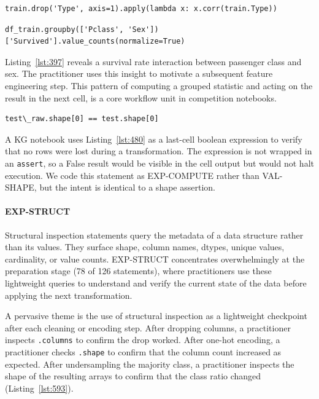 \begin{lstlisting}[caption={}, label={lst:564}]
train.drop('Type', axis=1).apply(lambda x: x.corr(train.Type))
\end{lstlisting}

\begin{lstlisting}[caption={}, label={lst:397}]
df_train.groupby(['Pclass', 'Sex'])['Survived'].value_counts(normalize=True)
\end{lstlisting}

Listing~\ref{lst:397} reveals a survival rate interaction between passenger class and sex.
The practitioner uses this insight
to motivate a subsequent feature engineering step.
This pattern of computing a grouped statistic
and acting on the result in the next cell,
is a core workflow unit in competition notebooks.

\begin{lstlisting}[caption={}, label={lst:480}]
test\_raw.shape[0] == test.shape[0]
\end{lstlisting}

A KG notebook uses Listing~\ref{lst:480}
as a last-cell boolean expression
to verify that no rows were lost during a transformation.
The expression is not wrapped in an \lstinline{assert},
so a False result would be visible in the cell output
but would not halt execution.
We code this statement as EXP-COMPUTE rather than VAL-SHAPE,
but the intent is identical to a shape assertion.

\paragraph{EXP-STRUCT}

Structural inspection statements
query the metadata of a data structure
rather than its values.
They surface shape, column names, dtypes, unique values, cardinality, or value counts.
EXP-STRUCT concentrates overwhelmingly at the preparation stage (78 of 126 statements),
where practitioners use these lightweight queries
to understand and verify the current state of the data
before applying the next transformation.

A pervasive theme is the use of structural inspection
as a lightweight checkpoint after each cleaning or encoding step.
After dropping columns,
a practitioner inspects \lstinline{.columns}
to confirm the drop worked.
After one-hot encoding,
a practitioner checks \lstinline{.shape}
to confirm that the column count increased as expected.
After undersampling the majority class,
a practitioner inspects the shape of the resulting arrays
to confirm that the class ratio changed (Listing~\ref{lst:593}).

